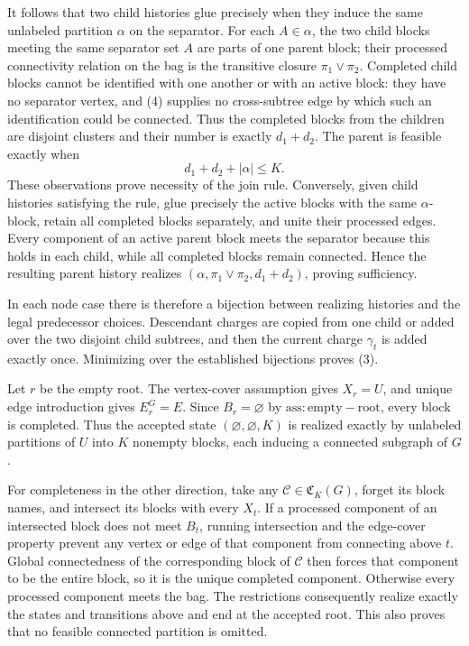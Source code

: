 It follows that two child histories glue precisely when they induce the same unlabeled partition \(\alpha\) on the separator.  For each \(A\in\alpha\), the two child blocks meeting the same separator set \(A\) are parts of one parent block; their processed connectivity relation on the bag is the transitive closure \(\pi_1\vee\pi_2\).  Completed child blocks cannot be identified with one another or with an active block: they have no separator vertex, and (4) supplies no cross-subtree edge by which such an identification could be connected.  Thus the completed blocks from the children are disjoint clusters and their number is exactly \(d_1+d_2\).  The parent is feasible exactly when
\[
 d_1+d_2+|\alpha|\le K.
\tag{5}
\]
These observations prove necessity of the join rule.  Conversely, given child histories satisfying the rule, glue precisely the active blocks with the same \(\alpha\)-block, retain all completed blocks separately, and unite their processed edges.  Every component of an active parent block meets the separator because this holds in each child, while all completed blocks remain connected.  Hence the resulting parent history realizes \((\alpha,\pi_1\vee\pi_2,d_1+d_2)\), proving sufficiency.

In each node case there is therefore a bijection between realizing histories and the legal predecessor choices.  Descendant charges are copied from one child or added over the two disjoint child subtrees, and then the current charge \(\gamma_t\) is added exactly once.  Minimizing over the established bijections proves (3).

Let \(r\) be the empty root.  The vertex-cover assumption gives \(X_r=U\), and unique edge introduction gives \(E_r^G=E\).  Since \(B_r=\varnothing\) by \(\mathrm{ass:empty-root}\), every block is completed.  Thus the accepted state \((\varnothing,\varnothing,K)\) is realized exactly by unlabeled partitions of \(U\) into \(K\) nonempty blocks, each inducing a connected subgraph of \(G\).

For completeness in the other direction, take any \(\mathcal C\in\mathfrak C_K(G)\), forget its block names, and intersect its blocks with every \(X_t\).  If a processed component of an intersected block does not meet \(B_t\), running intersection and the edge-cover property prevent any vertex or edge of that component from connecting above \(t\).  Global connectedness of the corresponding block of \(\mathcal C\) then forces that component to be the entire block, so it is the unique completed component.  Otherwise every processed component meets the bag.  The restrictions consequently realize exactly the states and transitions above and end at the accepted root.  This also proves that no feasible connected partition is omitted.

